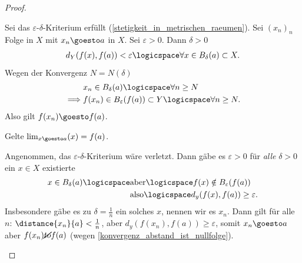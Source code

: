 \begin{proof}
    \begin{proofdescription}
        
        \item[\hin] Sei das \( \varepsilon \)-\( \delta \)-Kriterium erfüllt (\ref{stetigkeit_in_metrischen_raeumen}).
        Sei \( (x_n)_n \) Folge in \( X \) mit \( x_n\goesto a \) in \( X \). Sei \( \varepsilon>0 \). Dann \texists \( \delta>0 \) \sd
        \begin{align*}
            d_Y(f(x),f(a))<\varepsilon\logicspace\forall x\in B_\delta(a)\subset X.
        \end{align*} 
        Wegen der Konvergenz \texists \( N=N(\delta) \) \sd
        \begin{align*}
            &x_n\in B_\delta(a) \logicspace\forall n\geq N\\
            \implies &f(x_n)\in B_\varepsilon(f(a))\subset Y \logicspace \forall n\geq N.
        \end{align*}
        Also gilt \( f(x_n)\goesto f(a) \).
        \item[\rueck] Gelte \( \lim_{x \goesto a} (x)=f(a) \).
        
        Angenommen, das \( \varepsilon \)-\( \delta \)-Kriterium wäre verletzt. Dann gäbe es \( \varepsilon>0 \) \sd für \emph{alle} \( \delta>0 \) ein \( x\in X \) existierte \sd
        \begin{align*}
            x\in B_\delta(a)\logicspace \begin{aligned}[t] 
                &\text{aber} \logicspace f(x)\notin B_\varepsilon(f(a))\\
                &\text{also} \logicspace d_y(f(x), f(a)) \geq \varepsilon.
            \end{aligned}
        \end{align*}
        Insbesondere gäbe es zu \( \delta=\frac{1}{n} \) ein solches \( x \), nennen wir es \( x_n \). Dann gilt für alle \( n \): \( \distance{x_n}{a}<\frac{1}{n} \), aber \( d_y(f(x_n),f(a))\geq \varepsilon \), somit \( x_n\goesto a \) aber \( f(x_n)\cancel{to}f(a) \) (wegen \ref{konvergenz_abstand_ist_nullfolge}).
    \end{proofdescription}
    
    
\end{proof}
